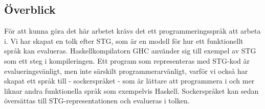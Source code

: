 \documentclass[Rapport]{subfiles}
\begin{document}

\subsection{Överblick}

\newcommand{\overviewTolk}[0] { node[concept] {Tolk} }
\newcommand{\overviewFrontend}[0] {     
    child[concept color=green!50!black] {
      node[concept] {Frontend}
      [clockwise from=90]
      child { node[concept] {Parser} }
      child { node[concept] {Avsockrare} }
      child { node[concept] {Lambda- lyftare} }
    }  
}
\newcommand{\overviewRuntime}[0] {

}

För att kunna göra det här arbetet krävs det ett programmeringsspråk
att arbeta i. Vi har skapat en tolk efter STG, som är en modell för hur
ett funktionellt språk kan evalueras. Haskellkompilatorn GHC använder sig
till exempel av STG som ett steg i kompileringen. Ett program som representeras
med STG-kod är evalueringsvänligt, men inte särskilt programmerarvänligt,
varför vi också har skapat ett språk till - sockerspråket -
som är lättare att programmera i och mer liknar andra funktionella
språk som exempelvis Haskell. Sockerspråket kan sedan översättas till
STG-representationen och evalueras i tolken.
\end{document}
